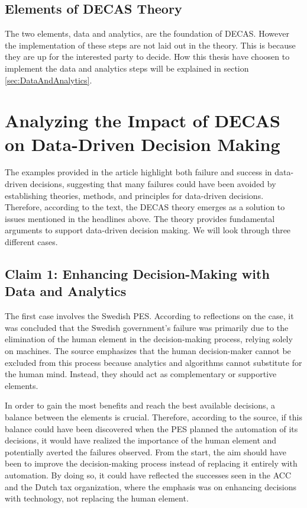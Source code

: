 \subsection{Elements of DECAS Theory}

The two elements, data and analytics, are the foundation of DECAS. However the 
implementation of these steps are not laid out in the theory. This is because they
are up for the interested party to decide. How this thesis have choosen to implement 
the data and analytics steps will be explained in section \ref{sec:DataAndAnalytics}.


\section{Analyzing the Impact of DECAS on Data-Driven Decision Making} 
The examples provided in the article highlight both failure and success in data-driven decisions, suggesting that many failures could have been avoided by establishing theories, methods, and principles for data-driven decisions. Therefore, according to the text, the DECAS theory emerges as a solution to issues mentioned in the headlines above. The theory provides fundamental arguments to support data-driven decision making. We will look through three different cases.

\subsection{Claim 1: Enhancing Decision-Making with Data and Analytics}
The first case involves the Swedish PES. According to reflections on the case, it was concluded that the Swedish government's failure was primarily due to the elimination of the human element in the decision-making process, relying solely on machines. The source emphasizes that the human decision-maker cannot be excluded from this process because analytics and algorithms cannot substitute for the human mind. Instead, they should act as complementary or supportive elements.

In order to gain the most benefits and reach the best available decisions, a balance between the elements is crucial. Therefore, according to the source, if this balance could have been discovered when the PES planned the automation of its decisions, it would have realized the importance of the human element and potentially averted the failures observed. From the start, the aim should have been to improve the decision-making process instead of replacing it entirely with automation. By doing so, it could have reflected the successes seen in the ACC and the Dutch tax organization, where the emphasis was on enhancing decisions with technology, not replacing the human element.

